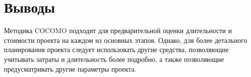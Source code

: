 \chapter{Выводы}

Методика COCOMO подходит для предварительной оценки длительности и стоимости проекта на каждом из основных этапов. Однако, для более детального планирования проекта следует использовать другие средства, позволяющие учитывать затраты и длительность более подробно, а также позволяющие предусматривать другие параметры проекта.